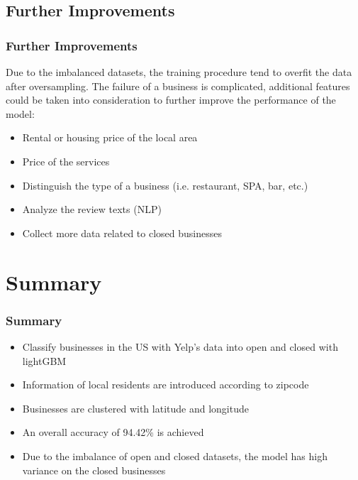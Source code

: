 \documentclass{beamer}
\begin{document}
\subsection{Further Improvements}
\begin{frame}
\frametitle{Further Improvements}
Due to the imbalanced datasets, the training procedure tend to overfit the data after oversampling. The failure of a business is complicated, additional features could be taken into consideration to further improve the performance of the model:\vspace{1em}

\begin{itemize}
	\item Rental or housing price of the local area
	\item Price of the services
	\item Distinguish the type of a business (i.e. restaurant, SPA, bar, etc.)
	\item Analyze the review texts (NLP)
	\item Collect more data related to closed businesses
\end{itemize}
 
\end{frame}
\section{Summary}
\begin{frame}
\frametitle{Summary}
\begin{itemize}
	\item Classify businesses in the US with Yelp's data into open and closed with lightGBM
	\item Information of local residents are introduced according to zipcode
	\item Businesses are clustered with latitude and longitude 
	\item An overall accuracy of 94.42\% is achieved
	\item Due to the imbalance of open and closed datasets, the model has high variance on the closed businesses 
\end{itemize}
\end{frame}
\end{document}
